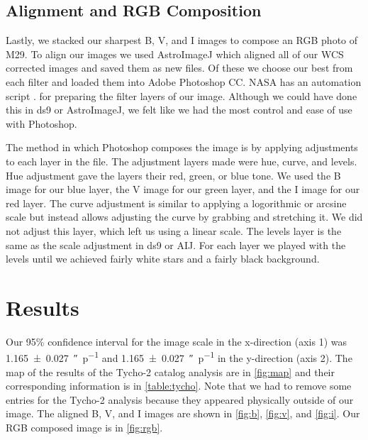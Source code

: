 \documentclass[%
aip,
jmp,
reprint,
floatfix,
nofootinbib
]{revtex4-1}
\begin{document}
	\subsection{Alignment and RGB Composition}
	Lastly, we stacked our sharpest B, V, and I images to compose an RGB photo of M29. To align our images we used AstroImageJ which aligned all of our WCS corrected images and saved them as new files. Of these we choose our best from each filter and loaded them into Adobe Photoshop CC. NASA has an automation script \citep{fits}. for preparing the filter layers of our image. Although we could have done this in ds9 or AstroImageJ, we felt like we had the most control and ease of use with Photoshop. 
	
	The method in which Photoshop composes the image is by applying adjustments to each layer in the file. The adjustment layers made were hue, curve, and levels. Hue adjustment gave the layers their red, green, or blue tone. We used the B image for our blue layer, the V image for our green layer, and the I image for our red layer. The curve adjustment is similar to applying a logorithmic or arcsine scale but instead allows adjusting the curve by grabbing and stretching it. We did not adjust this layer, which left us using a linear scale. The levels layer is the same as the scale adjustment in ds9 or AIJ. For each layer we played with the levels until we achieved fairly white stars and a fairly black background.
	
	

	

	\section{Results}


	 Our 95\% confidence interval for the image scale in the x-direction (axis 1) was \SI{1.165\pm.027}{\arcsecond\per p} and \SI{1.165\pm.027}{\arcsecond\per p} in the y-direction (axis 2). The map of the results of the Tycho-2 catalog analysis are in \autoref{fig:map} and their corresponding information is in \autoref{table:tycho}. Note that we had to remove some entries for the Tycho-2 analysis because they appeared physically outside of our image. The aligned B, V, and I images are shown in \autoref{fig:b}, \autoref{fig:v}, and \autoref{fig:i}. Our RGB composed image is in \autoref{fig:rgb}. 
\end{document}
